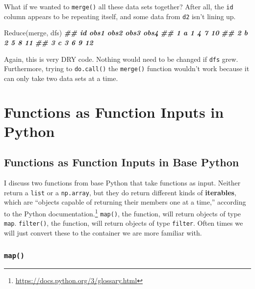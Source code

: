 \documentclass[
  12pt,
  krantz2]{krantz}
\makeatletter
\newenvironment{Shaded}{\begin{snugshade}}{\end{snugshade}}
\newcommand{\DocumentationTok}[1]{\textcolor[rgb]{0.37,0.37,0.37}{\textbf{\textit{#1}}}}
\newcommand{\FunctionTok}[1]{\textcolor[rgb]{0,0,0}{#1}}
\newcommand{\NormalTok}[1]{#1}
\renewcommand{\href}[2]{#2\footnote{\url{#1}}}
\newenvironment{kframe}{%
\medskip{}
\setlength{\fboxsep}{.8em}
 \def\at@end@of@kframe{}%
 \ifinner\ifhmode%
  \def\at@end@of@kframe{\end{minipage}}%
  \begin{minipage}{\columnwidth}%
 \fi\fi%
 \def\FrameCommand##1{\hskip\@totalleftmargin \hskip-\fboxsep
 \colorbox{shadecolor}{##1}\hskip-\fboxsep
     \hskip-\linewidth \hskip-\@totalleftmargin \hskip\columnwidth}%
 \MakeFramed {\advance\hsize-\width
   \@totalleftmargin\z@ \linewidth\hsize
   \@setminipage}}%
 {\par\unskip\endMakeFramed%
 \at@end@of@kframe}
\renewenvironment{Shaded}{\begin{kframe}}{\end{kframe}}
\makeatother
\begin{document}
What if we wanted to \texttt{merge()} all these data sets together? After all, the \texttt{id} column appears to be repeating itself, and some data from \texttt{d2} isn't lining up.

\begin{Shaded}
\begin{Highlighting}[]
\FunctionTok{Reduce}\NormalTok{(merge, dfs)}
\DocumentationTok{\#\#   id obs1 obs2 obs3 obs4}
\DocumentationTok{\#\# 1  a    1    4    7   10}
\DocumentationTok{\#\# 2  b    2    5    8   11}
\DocumentationTok{\#\# 3  c    3    6    9   12}
\end{Highlighting}
\end{Shaded}

Again, this is very DRY code. Nothing would need to be changed if \texttt{dfs} grew. Furthermore, trying to \texttt{do.call()} the \texttt{merge()} function wouldn't work because it can only take two data sets at a time.

\hypertarget{functions-as-function-inputs-in-python}{%
\section{Functions as Function Inputs in Python}\label{functions-as-function-inputs-in-python}}

\hypertarget{functions-as-function-inputs-in-base-python}{%
\subsection{Functions as Function Inputs in Base Python}\label{functions-as-function-inputs-in-base-python}}

I discuss two functions from base Python that take functions as input. Neither return a \texttt{list} or a \texttt{np.array}, but they do return different kinds of \textbf{iterables}, which are ``objects capable of returning their members one at a time,'' \href{https://docs.python.org/3/glossary.html}{according to the Python documentation.} \texttt{map()}, the function, will return objects of type \texttt{map}. \texttt{filter()}, the function, will return objects of type \texttt{filter}. Often times we will just convert these to the container we are more familiar with.

\hypertarget{map}{%
\subsubsection{\texorpdfstring{\texttt{map()}}{map()}}\label{map}}
\end{document}
